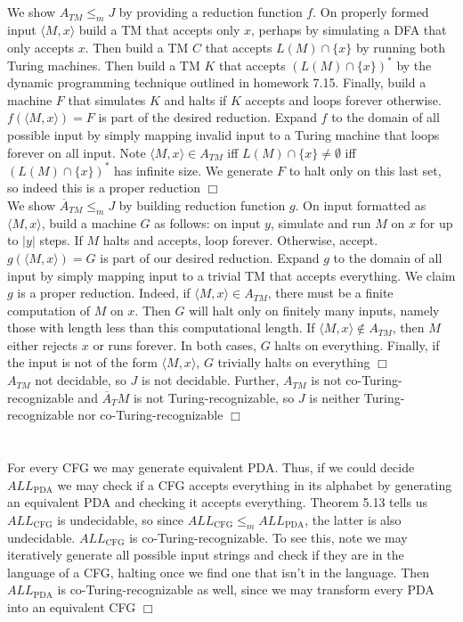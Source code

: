 \documentclass{article}
\begin{document}
\section{}
We show $A_{TM} \leqslant_m J$ by providing a reduction function $f$. On properly formed input $\langle M,x \rangle$ build a TM that accepts only $x$, perhaps by simulating a DFA that only accepts $x$. Then build a TM $C$ that accepts $L(M) \cap \{x\}$ by running both Turing machines. Then build a TM $K$ that accepts $(L(M) \cap \{x\})^*$ by the dynamic programming technique outlined in homework 7.15. Finally, build a machine $F$ that simulates $K$ and halts if $K$ accepts and loops forever otherwise. $f(\langle M,x \rangle) = F$ is part of the desired reduction. Expand $f$ to the domain of all possible input by simply mapping invalid input to a Turing machine that loops forever on all input. Note $\langle M,x \rangle \in A_{TM}$ iff $L(M) \cap \{x\} \neq \emptyset$ iff $(L(M) \cap \{x\})^*$ has infinite size. We generate $F$ to halt only on this last set, so indeed this is a proper reduction $\Box$\\
We show $\overline{A}_{TM} \leqslant_m J$ by building reduction function $g$. On input formatted as $\langle M,x \rangle$, build a machine $G$ as follows: on input $y$, simulate and run $M$ on $x$ for up to $|y|$ steps. If $M$ halts and accepts, loop forever. Otherwise, accept. $g(\langle M,x \rangle) = G$ is part of our desired reduction. Expand $g$ to the domain of all input by simply mapping  input to a trivial TM that accepts everything. We claim $g$ is a proper reduction. Indeed, if $\langle M,x \rangle \in A_{TM}$, there must be a finite computation of $M$ on $x$. Then $G$ will halt only on finitely many inputs, namely those with length less than this computational length. If $\langle M,x \rangle \notin A_{TM}$, then $M$ either rejects $x$ or runs forever. In both cases, $G$ halts on everything. Finally, if the input is not of the form $\langle M,x \rangle$, $G$ trivially halts on everything $\Box$\\
$A_{TM}$ not decidable, so $J$ is not decidable. Further, $A_{TM}$ is not co-Turing-recognizable and $\overline{A}_TM$ is not Turing-recognizable, so $J$ is neither Turing-recognizable nor co-Turing-recognizable $\Box$

\section{}
For every CFG we may generate equivalent PDA. Thus, if we could decide $ALL_{\mathrm{PDA}}$ we may check if a CFG accepts everything in its alphabet by generating an equivalent PDA and checking it accepts everything. Theorem 5.13 tells us $ALL_{\mathrm{CFG}}$ is undecidable, so since $ALL_{\mathrm{CFG}} \leqslant_m ALL_{\mathrm{PDA}}$, the latter is also undecidable. $ALL_{\mathrm{CFG}}$ is co-Turing-recognizable. To see this, note we may iteratively generate all possible input strings and check if they are in the language of a CFG, halting once we find one that isn't in the language. Then $ALL_{\mathrm{PDA}}$ is co-Turing-recognizable as well, since we may transform every PDA into an equivalent CFG $\Box$
\end{document}
